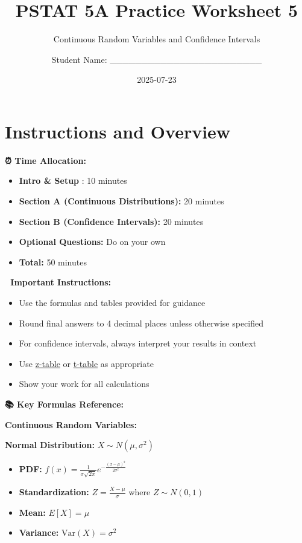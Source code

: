 \documentclass[
  11pt,
]{article}
\title{PSTAT 5A Practice Worksheet 5}
\subtitle{Continuous Random Variables and Confidence Intervals}
\author{Student Name: \_\_\_\_\_\_\_\_\_\_\_\_\_\_\_\_\_\_\_\_\_\_\_\_}
\date{2025-07-23}
\providecommand{\tightlist}{%
  \setlength{\itemsep}{0pt}\setlength{\parskip}{0pt}}
\renewcommand*\contentsname{Table of contents}
\newcommand\contentsname{Table of contents}
\begin{document}
\maketitle

\renewcommand*\contentsname{Table of contents}
{
\hypersetup{linkcolor=}
\setcounter{tocdepth}{3}
\tableofcontents
}

\section{Instructions and Overview}\label{instructions-and-overview}

\textbf{⏰ Time Allocation:}

\begin{itemize}
\item
  \textbf{Intro \& Setup} : 10 minutes
\item
  \textbf{Section A (Continuous Distributions):} 20 minutes
\item
  \textbf{Section B (Confidence Intervals):} 20 minutes
\item
  \textbf{Optional Questions:} Do on your own
\item
  \textbf{Total:} 50 minutes
\end{itemize}

\textbf{📝 Important Instructions:}

\begin{itemize}
\item
  Use the formulas and tables provided for guidance
\item
  Round final answers to 4 decimal places unless otherwise specified
\item
  For confidence intervals, always interpret your results in context
\item
  Use
  \href{https://math.arizona.edu/~rsims/ma464/standardnormaltable.pdf}{z-table}
  or
  \href{https://www.sjsu.edu/faculty/gerstman/StatPrimer/t-table.pdf}{t-table}
  as appropriate
\item
  Show your work for all calculations
\end{itemize}

\textbf{📚 Key Formulas Reference:}

\textbf{Continuous Random Variables:}

\textbf{Normal Distribution:} \(X \sim N(\mu, \sigma^2)\)

\begin{itemize}
\tightlist
\item
  \textbf{PDF:}
  \(f(x) = \frac{1}{\sigma\sqrt{2\pi}} e^{-\frac{(x-\mu)^2}{2\sigma^2}}\)
\item
  \textbf{Standardization:} \(Z = \frac{X - \mu}{\sigma}\) where
  \(Z \sim N(0,1)\)
\item
  \textbf{Mean:} \(E[X] = \mu\)
\item
  \textbf{Variance:} \(\text{Var}(X) = \sigma^2\)
\end{itemize}
\end{document}
